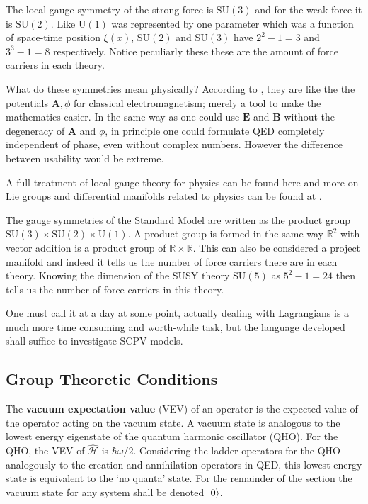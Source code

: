 The local gauge symmetry of the strong force is $\mathrm{SU}(3)$ and for the weak force it is $\mathrm{SU}(2)$. Like $\mathrm{U}(1)$ was represented by one parameter which was a function of space-time position $\xi(x)$, $\mathrm{SU}(2)$ and $\mathrm{SU}(3)$ have $2^2-1=3$ and $3^3-1=8$ respectively. Notice peculiarly these these are the amount of force carriers in each theory.

What do these symmetries mean physically? According to \cite{SCPV6}, they are like the the potentials $\mathbf{A}, \phi$ for classical electromagnetism; merely a tool to make the mathematics easier. In the same way as one could use $\mathbf{E}$ and $\mathbf{B}$ without the degeneracy of $\mathbf{A}$ and $\phi$, in principle one could formulate QED completely independent of phase, even without complex numbers.
However the difference between usability would be extreme.


A full treatment of local gauge theory for physics can be found here \cite{SCPV6} and more on Lie groups and differential manifolds related to physics can be found at \cite{SCPV3}. 

The gauge symmetries of the Standard Model are written as the product group $\mathrm{SU}(3)\times \mathrm{SU}(2)\times \mathrm{U}(1)$. A product group is formed in the same way $\mathbb{R}^2$ with vector addition is a product group of $\mathbb{R}\times\mathbb{R}$. This can also be considered a project manifold and indeed it tells us the number of force carriers there are in each theory. Knowing the dimension of the SUSY theory $\mathrm{SU}(5)$ as $5^2-1 = 24$ then tells us the number of force carriers in this theory.

One must call it at a day at some point, actually dealing with Lagrangians is a much more time consuming and worth-while task, but the language developed shall suffice to investigate SCPV models.

\subsection{Group Theoretic Conditions}
The \textbf{vacuum expectation value} (VEV) of an operator is the expected value of the operator acting on the vacuum state. A vacuum state is analogous to the lowest energy eigenstate of the quantum harmonic oscillator (QHO). For the QHO, the VEV of $\hat{\mathcal{H}}$ is $\hbar \omega /2$. Considering the ladder operators for the QHO analogously to the creation and annihilation operators in QED, this lowest energy state is equivalent to the `no quanta' state. For the remainder of the section the vacuum state for any system shall be denoted  $\ket{0}$.


